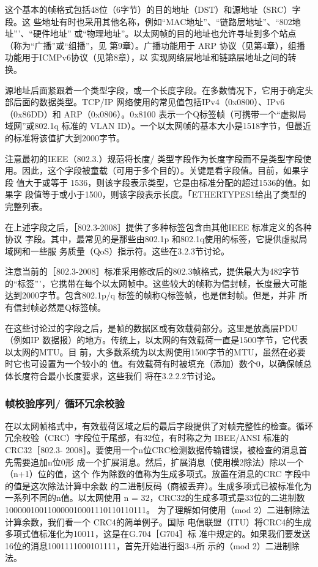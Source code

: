 这个基本的帧格式包括48位（6字节）的目的地址（DST）和源地址（SRC）字段。这
些地址有时也采用其他名称，例如“MAC地址”、“链路层地址”、“802地址”’、“硬件地址”
或“物理地址”。以太网帧的目的地址也允许寻址到多个站点（称为“广播”或“组播”，见
第9章）。广播功能用于 ARP 协议（见第4章），组播功能用于ICMPv6协议（见第8章），以
实现网络层地址和链路层地址之间的转换。

源地址后面紧跟着一个类型字段，或一个长度字段。在多数情况下，它用于确定头
部后面的数据类型。TCP/IP 网络使用的常见值包括IPv4（0x0800）、IPv6（0x86DD）和
ARP（0x0806）。0x8100 表示一个Q标签帧（可携带一个“虚拟局域网”或802.1q 标准的
VLAN ID）。一个以太网帧的基本大小是1518字节，但最近的标准将该值扩大到2000字节。

\begin{tcolorbox}
    注意最初的IEEE（802.3.）规范将长度/ 类型字段作为长度字段而不是类型字段使
    用。因此，这个字段被童载（可用于多个目的）。关键是看字段值。目前，如果字段
    值大于或等于 1536，则该字段表示类型，它是由标准分配的超过1536的值。如果字
    段值等于或小于1500，则该字段表示长度。「ETHERTYPES1给出了类型的完整列表。
\end{tcolorbox}

在上述字段之后，［802.3-2008］提供了多种标签包含由其他IEEE 标准定义的各种协议
字段。其中，最常见的是那些由802.1p 和802.1q使用的标签，它提供虚拟局域网和一些服
务质量（QoS）指示符。这些在3.2.3节讨论。

\begin{tcolorbox}
    注意当前的［802.3-2008］标准采用修改后的802.3帧格式，提供最大为482字节
    的“标签”'，它携带在每个以太网帧中。这些较大的帧称为信封帧，长度最大可能
    达到2000字节。包含802.1p/q 标签的帧称Q标签帧，也是信封帧。但是，并非
    所有信封帧必然是Q标签帧。
\end{tcolorbox}

在这些讨论过的字段之后，是帧的数据区或有效载荷部分。这里是放高层PDU（例如IP
数据报）的地方。传统上，以太网的有效载荷一直是1500字节，它代表以太网的MTU。目
前，大多数系统为以太网使用1500字节的MTU，虽然在必要时它也可设置为一个较小的
值。有效载荷有时被填充（添加）数个0，以确保帧总体长度符合最小长度要求，这些我们
将在3.2.2.2节讨论。

\subsubsection{帧校验序列/ 循环冗余校验}

在以太网帧格式中，有效载荷区域之后的最后字段提供了对帧完整性的检查。循环
冗余校验（CRC）字段位于尾部，有32位，有时称之为 IBEE/ANSI 标准的CRC32［802.3-
2008］。要使用一个n位CRC检测数据传输错误，被检查的消息首先需要追加n位0形
成一个扩展消息。然后，扩展消息（使用模2除法）除以一个（n+1）位的值，这个
作为除数的值称为生成多项式。放置在消息的CRC 字段中的值是这次除法计算中余数
的二进制反码（商被丢弃）。生成多项式已被标准化为一系列不同的n值。以太网使用
n = 32，CRC32的生成多项式是33位的二进制数100000100110000010001110110110111。
为了理解如何使用（mod 2）二进制除法计算余数，我们看一个 CRC4的简单例子。国际
电信联盟（ITU）将CRC4的生成多项式值标准化为10011，这是在G.704［G704］标
准中规定的。如果我们要发送16位的消息1001111000101111，首先开始进行图3-4所
示的（mod 2）二进制除法。

